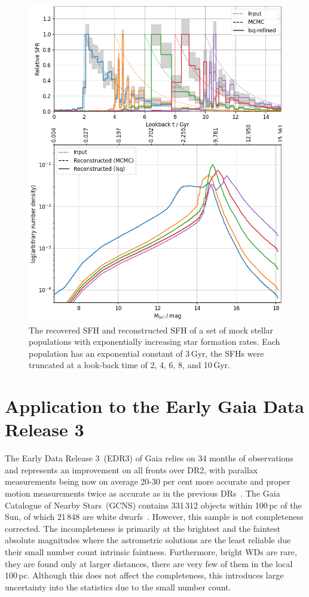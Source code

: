 \documentclass[fleqn,usenatbib]{mnras}
\begin{document}
\begin{figure}
  \includegraphics[width=\columnwidth]{figures/fig_01_exponential_decay_wdlf.png}
  \caption{The recovered SFH and reconstructed SFH of a set of mock stellar populations with exponentially increasing star formation rates. Each population has an exponential constant of 3\,Gyr, the SFHs were truncated at a look-back time of 2, 4, 6, 8, and 10\,Gyr.}
  \label{fig:exponential_sfh}
\end{figure}

\section{Application to the Early Gaia Data Release 3}
The Early Data Release 3~(EDR3) of Gaia relies on 34 months of
observations and represents an improvement on all fronts over DR2,
with parallax measurements being now on average 20-30 per cent more
accurate and proper motion measurements twice as accurate as in the
previous DRs~\citep{2021A&A...649A...1G, 2021A&A...649A...2L}.
The Gaia Catalogue of Nearby Stars~(GCNS) contains 331\,312 objects within
100\,pc of the Sun, of which 21\,848 are white dwarfs~\citep{2021A&A...649A...6G}. 
However, this sample is not completeness corrected. The incompleteness
is primarily at the brightest and the faintest absolute magnitudes
where the astrometric solutions are the least reliable due their
small number count intrinsic faintness. Furthermore, bright WDs are rare,
they are found only at larger distances, there are very few of them in
the local 100\,pc. Although this does not affect the completeness, this
introduces large uncertainty into the statistics due to the small
number count.
\end{document}
